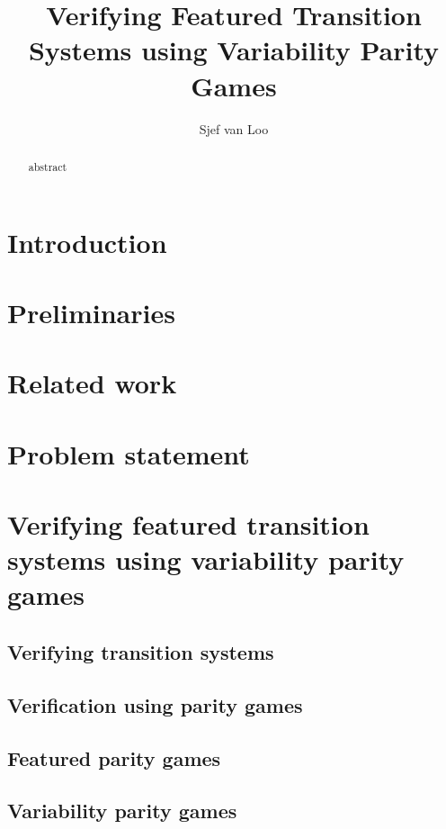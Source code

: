\documentclass[]{article}
\title{Verifying Featured Transition Systems using Variability Parity Games}
\author{Sjef van Loo}
\theoremstyle{definition}
\begin{document}
\maketitle
\begin{abstract}
	abstract
\end{abstract}

\newpage
\tableofcontents

\pagebreak
\section{Introduction}


\section{Preliminaries}


\section{Related work}


\section{Problem statement}


\pagebreak
\section{Verifying featured transition systems using variability parity games}
\label{part:verifying}

\subsection{Verifying transition systems}


\subsection{Verification using parity games}


\subsection{Featured parity games}


\subsection{Variability parity games}

\end{document}

